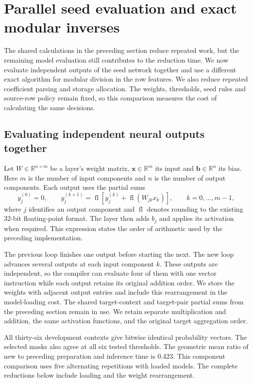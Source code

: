 \clearpage
\section{Parallel seed evaluation and exact modular inverses}
\label{sec:parallel-inference}
The shared calculations in the preceding section reduce repeated work, but the
remaining model evaluation still contributes to the reduction time. We now
evaluate independent outputs of the seed network together and use a different
exact algorithm for modular division in the row features. We also reduce
repeated coefficient parsing and storage allocation. The weights,
thresholds, seed rules and source-row policy remain fixed, so this comparison
measures the cost of calculating the same decisions.

\subsection{Evaluating independent neural outputs together}
Let $W\in\mathbb R^{n\times m}$ be a layer's weight matrix,
$\boldsymbol x\in\mathbb R^m$ its input and $\boldsymbol b\in\mathbb R^n$
its bias. Here $m$ is the number of input components and $n$ is the number
of output components. Each output uses the partial sums
\[
 y_j^{(0)}=0,\qquad
 y_j^{(k+1)}
 =\operatorname{fl}\!\left[y_j^{(k)}
   +\operatorname{fl}(W_{jk}x_k)\right],
 \qquad k=0,\ldots,m-1 ,
\]
where $j$ identifies an output component and $\operatorname{fl}$ denotes
rounding to the existing 32-bit floating-point format. The layer then adds
$b_j$ and applies its activation when required. This expression states the
order of arithmetic used by the preceding implementation.

The previous loop finishes one output before starting the next. The new loop
advances several outputs at each input component $k$. These outputs are
independent, so the compiler can evaluate four of them with one vector
instruction while each output retains its original addition order.
We store the weights with adjacent output entries and include this
rearrangement in the model-loading cost. The shared target-context and
target-pair partial sums from the preceding section remain in use.
We retain separate multiplication and addition, the same activation functions,
and the original target aggregation order.

All thirty-six development contexts give bitwise identical probability
vectors. The selected masks also agree at all six tested thresholds.
The geometric mean ratio of new to preceding preparation and inference
time is 0.423. This component comparison uses five alternating
repetitions with loaded models. The complete reductions below include loading
and the weight rearrangement.


